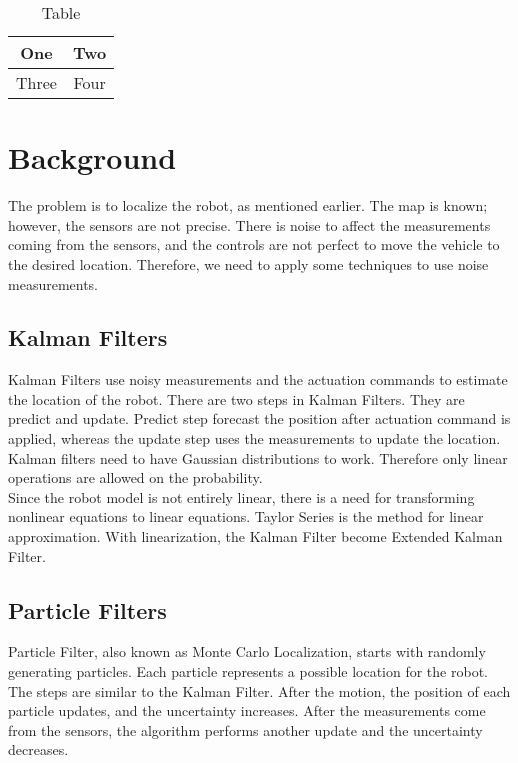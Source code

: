 \documentclass[10pt,journal,compsoc]{IEEEtran}
\begin{document}
\begin{table}[h]
\caption{Table}
\label{table_example}
\begin{center}
\begin{tabular}{|c||c|}
\hline
One & Two\\
\hline
Three & Four\\
\hline
\end{tabular}
\end{center}
\end{table}



\section{Background}
The problem is to localize the robot, as mentioned earlier. The map is known; however, the sensors are not precise. There is noise to affect the measurements coming from the sensors, and the controls are not perfect to move the vehicle to the desired location. Therefore, we need to apply some techniques to use noise measurements.\cite{lamport1994latex}

\subsection{Kalman Filters}
Kalman Filters use noisy measurements and the actuation commands to estimate the location of the robot. There are two steps in Kalman Filters. They are predict and update. Predict step forecast the position after actuation command is applied, whereas the update step uses the measurements to update the location.
Kalman filters need to have Gaussian distributions to work. Therefore only linear operations are allowed on the probability. \\
Since the robot model is not entirely linear, there is a need for transforming nonlinear equations to linear equations. Taylor Series is the method for linear approximation. With linearization, the Kalman Filter become Extended Kalman Filter. \cite{wikipediaKF}

\subsection{Particle Filters}
Particle Filter, also known as Monte Carlo Localization, starts with randomly generating particles. Each particle represents a possible location for the robot. The steps are similar to the Kalman Filter. After the motion, the position of each particle updates, and the uncertainty increases. After the measurements come from the sensors, the algorithm performs another update and the uncertainty decreases.
\end{document}
